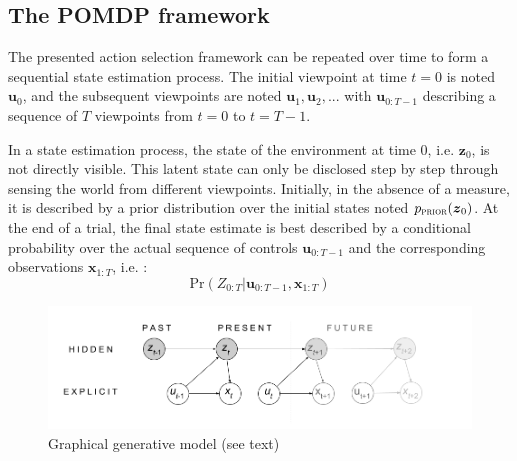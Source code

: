 \documentclass[12pt,twoside,openright]{article}
\begin{document}
\subsection{The POMDP framework}

The presented action selection framework can be repeated over time to form a sequential state estimation process. 
The initial viewpoint at time $t=0$ is noted $\boldsymbol{u}_0$, and the subsequent viewpoints  are noted $\boldsymbol{u}_1, \boldsymbol{u}_2, ...$ with $\boldsymbol{u}_{0:T-1}$ describing a sequence of $T$ viewpoints from $t=0$ to $t=T-1$. %

In a state estimation process, the state of the environment at time 0, i.e. $\boldsymbol{z}_0$, is not directly visible. This latent state can only be disclosed step by step through sensing the world from different viewpoints. Initially, in the absence of a measure, it is described by a prior distribution over the initial states noted $p_\text{\sc prior}(\boldsymbol{z}_0)$. At the end of a trial, the final state estimate is best described by a conditional probability over the actual sequence of controls $\boldsymbol{u}_{0:T-1}$ and the corresponding observations $\boldsymbol{x}_{1:T}$, i.e. :
$$\text{Pr}(Z_{0:T}|\boldsymbol{u}_{0:T-1}, \boldsymbol{x}_{1:T})$$

\begin{figure}[t!]
	\centerline{
		\includegraphics[width = \linewidth]{img/ICLR-graphical-v2.png} 
	}
	\caption{Graphical generative model (see text)}\label{fig:pomdp}
\end{figure}
\end{document}
